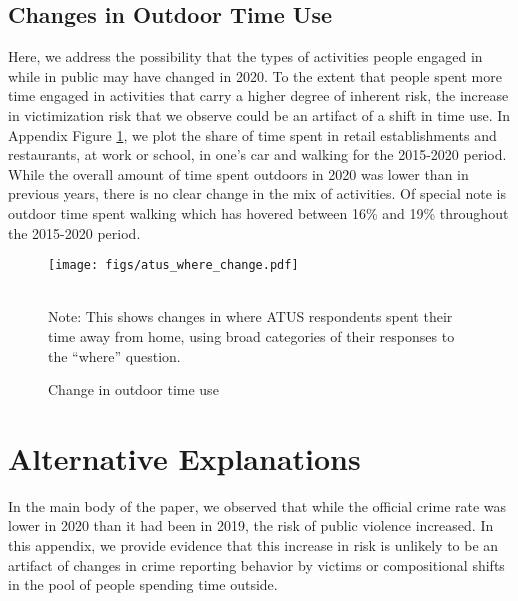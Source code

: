 \subsection{Changes in Outdoor Time Use}
Here, we address the possibility that the types of activities people engaged in while in public may have changed in 2020. To the extent that people spent more time engaged in activities that carry a higher degree of inherent risk, the increase in victimization risk that we observe could be an artifact of a shift in time use. In Appendix Figure \ref{fig:atus_where}, we plot the share of time spent in retail establishments and restaurants, at work or school, in one's car and walking for the 2015-2020 period. While the overall amount of time spent outdoors in 2020 was lower than in previous years, there is no clear change in the mix of activities. Of special note is outdoor time spent walking which has hovered between 16\% and 19\% throughout the 2015-2020 period.

\begin{figure}
\begin{center}
\texttt{[image: figs/atus\_where\_change.pdf]}
\caption{Change in outdoor time use}
\label{fig:atus_where}
\end{center}
        \vspace*{0mm}  \\ 
    \newline 
Note: This shows changes in where ATUS respondents spent their time away from home, using broad categories of their responses to the ``where'' question.
\end{figure}


\newpage
\clearpage
\section{Alternative Explanations} \label{sec:appendix_alternative}
In the main body of the paper, we observed that while the official crime rate was lower in 2020 than it had been in 2019, the risk of public violence increased. In this appendix, we provide evidence that this increase in risk is unlikely to be an artifact of changes in crime reporting behavior by victims or compositional shifts in the pool of people spending time outside.

